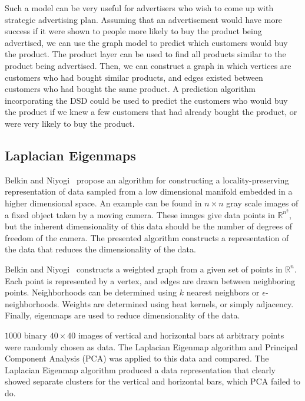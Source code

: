 Such a model can be very useful for advertisers who wish to come up with strategic advertising plan. Assuming that an advertisement would have more success if it were shown to people more likely to buy the product being advertised, we can use the graph model to predict which customers would buy the product. The product layer can be used to find all products similar to the product being advertised. Then, we can construct a graph in which vertices are customers who had bought similar products, and edges existed between customers who had bought the same product. A prediction algorithm incorporating the DSD could be used to predict the customers who would buy the product if we knew a few customers that had already bought the product, or were very likely to buy the product.


\subsection{Laplacian Eigenmaps}
Belkin and Niyogi~\cite{belkin2002laplacian} propose an algorithm for constructing a locality-preserving representation of data sampled from a low dimensional manifold embedded in a higher dimensional space. An example can be found in $n\times n$ gray scale images of a fixed object taken by a moving camera. These images give data points in $\mathbb{R}^{n^{2}}$, but the inherent dimensionality of this data should be the number of degrees of freedom of the camera. The presented algorithm constructs a representation of the data that reduces the dimensionality of the data.

Belkin and Niyogi~\cite{belkin2002laplacian} constructs a weighted graph from a given set of points in $\mathbb{R}^{n}$. Each point is represented by a vertex, and edges are drawn between neighboring points. Neighborhoods can be determined using $k$ nearest neighbors or $\epsilon$-neighborhoods. Weights are determined using heat kernels, or simply adjacency. Finally, eigenmaps are used to reduce dimensionality of the data.

$1000$ binary $40 \times 40$ images of vertical and horizontal bars at arbitrary points were randomly chosen as data. The Laplacian Eigenmap algorithm and Principal Component Analysis (PCA) was applied to this data and compared. The Laplacian Eigenmap algorithm produced a data representation that clearly showed separate clusters for the vertical and horizontal bars, which PCA failed to do.
